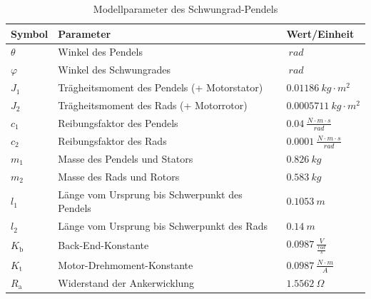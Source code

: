 \begin{table}[H]
    \centering
    \begin{tabular}{|lll|}
        \hline
        \rowcolor{grey}
        \textbf{Symbol}     & \textbf{Parameter}                                & \textbf{Wert/Einheit}                         \\ \hline
        $\theta$            & Winkel des Pendels                                & $\SI{}{rad}$                                  \\
        $\varphi$           & Winkel des Schwungrades                           & $\SI{}{rad}$                                  \\
        $J_{\mathrm{1}}$    & Trägheitsmoment des Pendels (+ Motorstator)       & $\SI{0.01186}{kg \cdot m^2}$                  \\
        $J_{\mathrm{2}}$    & Trägheitsmoment des Rads (+ Motorrotor)           & $\SI{0.0005711}{kg \cdot m^2}$                \\
        $c_{\mathrm{1}}$    & Reibungsfaktor des Pendels                        & $\SI{0.04}{\frac{N \cdot m \cdot s}{rad}}$    \\
        $c_{\mathrm{2}}$    & Reibungsfaktor des Rads                           & $\SI{0.0001}{\frac{N \cdot m \cdot s}{rad}}$  \\
        $m_{\mathrm{1}}$    & Masse des Pendels und Stators                     & $\SI{0.826}{kg}$                              \\
        $m_{\mathrm{2}}$    & Masse des Rads und Rotors                         & $\SI{0.583}{kg}$                              \\
        $l_{\mathrm{1}}$    & Länge vom Ursprung bis Schwerpunkt des Pendels    & $\SI{0.1053}{m}$                              \\
        $l_{\mathrm{2}}$    & Länge vom Ursprung bis Schwerpunkt des Rads       & $\SI{0.14}{m}$                                \\
        $K_{\mathrm{b}}$    & Back-End-Konstante                                & $\SI{0.0987}{\frac{V}{\frac{rad}{s}}}$        \\
        $K_{\mathrm{t}}$    & Motor-Drehmoment-Konstante                        & $\SI{0.0987}{\frac{N \cdot m}{A}}$            \\
        $R_{\mathrm{a}}$    & Widerstand der Ankerwicklung                      & $\SI{1.5562}{\Omega}$                         \\ \hline
    \end{tabular}
    \caption{Modellparameter des Schwungrad-Pendels}
    \label{tab:Tabelle1.1}
\end{table}


